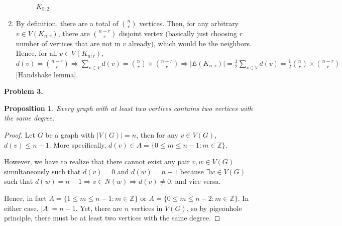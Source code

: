 \documentclass{article}
\newtheorem{prop}[thm]{Proposition}
\begin{document}
\begin{enumerate}[label=(\alph*)]
\begin{figure}[htb]
\begin{minipage}{.4\textwidth}
            \qquad\qquad$K_{5:2}$\label{fig:2}
        \end{minipage}        
    \end{figure} 
    \item By definition, there are a total of ${n\choose r}$ vertices. Then, for any arbitrary $v \in V(K_{n:r})$, there are ${n-r\choose r}$ disjoint vertex (basically just choosing $r$ number of vertices that are not in $v$ already), which would be the neighbors. 
    Hence, for all $v\in V(K_{n:r})$, $d(v) = {n-r\choose r} \Rightarrow \sum\limits_{v\in V}d(v) = {n\choose r}\times {n-r \choose r} \Rightarrow |E(K_{n:r})| = \frac{1}{2}\sum\limits_{v\in V}d(v) = \frac{1}{2}{n\choose r}\times {n-r \choose r}$ [Handshake lemma].
\end{enumerate}
\bigbreak

\textbf{Problem 3.}
\begin{prop}
    Every graph with at least two vertices contains two vertices with the same degree.
\end{prop}
\begin{proof}
    Let $G$ be a graph with $|V(G)|=n$, then for any $v \in V(G)$, $d(v) \leq n-1$. 
    More specifically, $d(v) \in A = \{0 \le m \le n-1: m \in \mathbb{Z}\}$.
    
    However, we have to realize that there cannot exist any pair $v, w \in V(G)$ simultaneously such that $d(v) = 0$ and $d(w) = n-1$ because $\exists w \in V(G)$ such that $d(w) = n-1 \Rightarrow v\in N(w)\Rightarrow d(v)\neq0$, and vice versa.
    
    Hence, in fact $A = \{1 \le m \le n-1: m \in \mathbb{Z}\}$ or $A = \{0 \le m \le n-2: m \in \mathbb{Z}\}$.
    In either case, $|A| = n-1$. Yet, there are $n$ vertices in $V(G)$, so by pigeonhole principle, there must be at least two vertices with the same degree.
\end{proof}
\bigbreak
\end{document}
